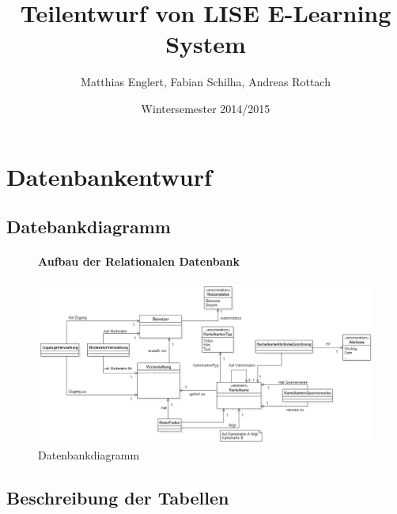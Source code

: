 \documentclass[12pt,a4paper]{article}
\title{Teilentwurf von  LISE E-Learning System}
\author{Matthias Englert, Fabian Schilha, Andreas Rottach}
\date{Wintersemester 2014/2015}
\begin{document}
\maketitle
\newpage
\tableofcontents
\newpage

\section{Datenbankentwurf}

\subsection{Datebankdiagramm}
\begin{figure}[H]
	\centering
	\paragraph{Aufbau der Relationalen Datenbank}	\includegraphics[width=\textwidth]{Bilder/Datenbank/Datenbankentwurf.png}
	\caption{Datenbankdiagramm}
	\label{Datenbankdiagramm}
\end{figure}

\subsection{Beschreibung der Tabellen}
\end{document}
